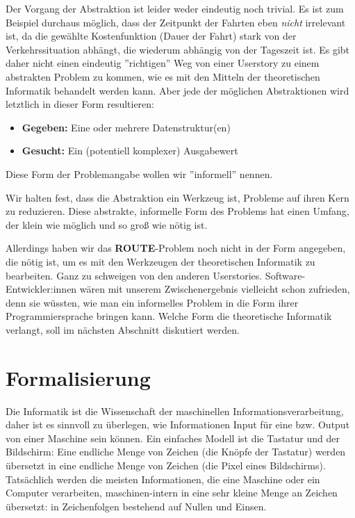 Der Vorgang der Abstraktion ist leider weder eindeutig noch trivial.
Es ist zum Beispiel durchaus möglich,
dass der Zeitpunkt der Fahrten eben \emph{nicht} irrelevant ist,
da die gewählte Kostenfunktion (Dauer der Fahrt)
stark von der Verkehrssituation abhängt,
die wiederum abhängig von der Tageszeit ist.
Es gibt daher nicht einen eindeutig ''richtigen'' Weg von einer Userstory zu einem abstrakten Problem zu kommen,
wie es mit den Mitteln der theoretischen Informatik behandelt werden kann.
Aber jede der möglichen Abstraktionen wird letztlich in dieser Form resultieren:
\begin{itemize}
    \item \textbf{Gegeben:} Eine oder mehrere Datenstruktur(en)
    \item \textbf{Gesucht:} Ein (potentiell komplexer) Ausgabewert
\end{itemize}
Diese Form der Problemangabe wollen wir ''informell'' nennen.

Wir halten fest, dass die Abstraktion ein Werkzeug ist,
Probleme auf ihren Kern zu reduzieren.
Diese abstrakte, informelle Form des Problems hat einen Umfang, der klein wie möglich und so groß wie nötig ist.

Allerdings haben wir das \textbf{ROUTE}-Problem noch nicht in der Form angegeben,
die nötig ist, um es mit den Werkzeugen der theoretischen Informatik zu bearbeiten.
Ganz zu schweigen von den anderen Userstories.
Software-Entwickler:innen wären mit unserem Zwischenergebnis vielleicht schon zufrieden,
denn sie wüssten, wie man ein informelles Problem in die Form ihrer Programmiersprache bringen kann.
Welche Form die theoretische Informatik verlangt, soll im nächsten Abschnitt diskutiert werden.

\section{Formalisierung}

Die Informatik ist die Wissenschaft der maschinellen Informationsverarbeitung,
daher ist es sinnvoll zu überlegen,
wie Informationen Input für eine bzw. Output von einer Maschine sein können.
Ein einfaches Modell ist die Tastatur und der Bildschirm:
Eine endliche Menge von Zeichen (die Knöpfe der Tastatur) werden übersetzt in eine
endliche Menge von Zeichen (die Pixel eines Bildschirms).
Tatsächlich werden die meisten Informationen,
die eine Maschine oder ein Computer verarbeiten,
maschinen-intern in eine sehr kleine Menge an Zeichen übersetzt:
in Zeichenfolgen bestehend auf Nullen und Einsen.

